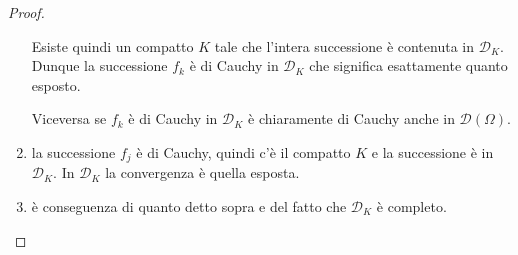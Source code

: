 \documentclass[italian,a4paper,oneside,headinclude]{scrbook}
\newcommand{\D}{\mathcal D}
\begin{document}
\begin{proof}
\begin{enumerate}
    Esiste quindi un compatto $K$ tale che
    l'intera successione è contenuta in $\D_K$.
    Dunque la successione $f_k$ è di Cauchy in $\D_K$ che significa
    esattamente quanto esposto.

    Viceversa se $f_k$ è di Cauchy in $\D_K$ è chiaramente di Cauchy
    anche in $\D(\Omega)$.

  \item
    la successione $f_j$ è di Cauchy, quindi c'è il compatto $K$ e la
    successione è in $\D_K$. In $\D_K$ la convergenza è quella
    esposta.

  \item è conseguenza di quanto detto sopra e del fatto che $\D_K$ è completo.

  \end{enumerate}
\end{proof}
\end{document}
